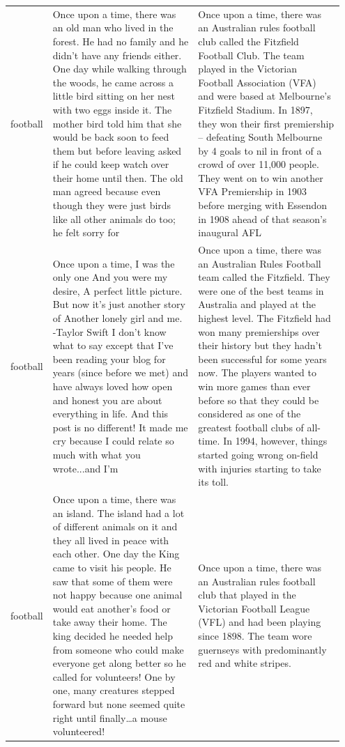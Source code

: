 \documentclass{article}
\theoremstyle{plain}
\theoremstyle{definition}
\theoremstyle{remark}
\begin{document}
\begin{table}[t]
\begin{tabular}{p{0.05\linewidth} p{0.45\linewidth} p{0.45\linewidth}}
\addlinespace
football & Once upon a time, there was an old man who lived in the forest. He had no family and he didn’t have any friends either.
One day while walking through the woods, he came across a little bird sitting on her nest with two eggs inside it. The mother bird told him that she would be back soon to feed them but before leaving asked if he could keep watch over their home until then.
The old man agreed because even though they were just birds like all other animals do too; he felt sorry for & Once upon a time, there was an Australian rules football club called the Fitzfield Football Club. The team played in the Victorian Football Association (VFA) and were based at Melbourne’s Fitzfield Stadium.
In 1897, they won their first premiership – defeating South Melbourne by 4 goals to nil in front of a crowd of over 11,000 people. They went on to win another VFA Premiership in 1903 before merging with Essendon in 1908 ahead of that season’s inaugural AFL \\
\addlinespace
football & Once upon a time, I was the only one
And you were my desire,
A perfect little picture.
But now it's just another story of
Another lonely girl and me. -Taylor Swift
I don't know what to say except that I've been reading your blog for years (since before we met) and have always loved how open and honest you are about everything in life. And this post is no different! It made me cry because I could relate so much with what you wrote...and I'm & Once upon a time, there was an Australian Rules Football team called the Fitzfield. They were one of the best teams in Australia and played at the highest level.
The Fitzfield had won many premierships over their history but they hadn’t been successful for some years now. The players wanted to win more games than ever before so that they could be considered as one of the greatest football clubs of all-time.
In 1994, however, things started going wrong on-field with injuries starting to take its toll. \\
\addlinespace
football & Once upon a time, there was an island. The island had a lot of different animals on it and they all lived in peace with each other.
One day the King came to visit his people. He saw that some of them were not happy because one animal would eat another’s food or take away their home.
The king decided he needed help from someone who could make everyone get along better so he called for volunteers! One by one, many creatures stepped forward but none seemed quite right until finally…a mouse volunteered!
 & Once upon a time, there was an Australian rules football club that played in the Victorian Football League (VFL) and had been playing since 1898. The team wore guernseys with predominantly red and white stripes.

\end{tabular}
\end{table}
\end{document}
